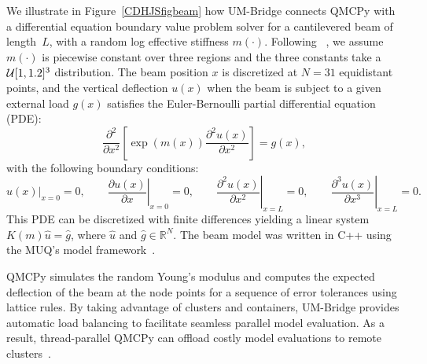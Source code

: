 \documentclass[graybox]{svmult}
\begin{document}
We illustrate in Figure~\ref{CDHJSfigbeam} how UM-Bridge connects QMCPy with a differential equation boundary value problem solver for a cantilevered beam of length~$L$, with a random log effective stiffness $m(\cdot)$. Following ~\cite{ParSee22a}, we assume $m(\cdot)$ is piecewise constant over three regions and the three constants take a ${\mathcal{U}}[1,1.2]^3$ distribution.
The beam position $x$ is discretized at $N=31$ equidistant points, and
the vertical deflection $u(x)$ when the beam is subject to a given external load  $g(x)$ satisfies the Euler-Bernoulli partial differential equation (PDE):
$$ \frac{\partial^2}{\partial x^2}\left[ \exp(m(x)) \frac{\partial^2  u(x)}{\partial x^2}\right] = g(x),$$
with the following boundary conditions:
$$ \left.u(x)\right|_{x=0} = 0, \qquad
\left.\frac{\partial u(x)}{\partial x}\right|_{x=0} = 0, \qquad
\left.\frac{\partial^2 u(x)}{\partial x^2}\right|_{x=L} = 0, \qquad  \left.\frac{\partial^3 u(x)}{\partial x^3}\right|_{x=L} = 0. $$
This PDE can be discretized with finite differences yielding a linear system $K(m) \hat{u} = \hat{g}$, where $\hat{u}$ and $\hat{g} \in \mathbb{R}^N$. 
The beam model was written in C++ using the MUQ's model framework~\cite{MUQ2}. %

QMCPy simulates the random Young's modulus and computes the expected deflection of the beam at the node points for a sequence of error tolerances using lattice rules.  By taking advantage of clusters and containers, UM-Bridge provides automatic load balancing to facilitate seamless parallel model evaluation. As a result, thread-parallel QMCPy can offload costly model evaluations to remote clusters~\cite{seelinger2023lowering}.
\end{document}
